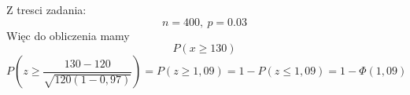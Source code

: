 \medskip
{} 

Z tresci zadania:
$$ n=400, \: p=0.03 $$
Więc do obliczenia mamy
$$P(x \geq 130) $$
$$P(z \geq \frac {130-120}{\sqrt {120(1-0,97)}}) = P(z \geq 1,09)= 1 - P(z \leq 1,09)=1- \Phi (1,09)
$$
